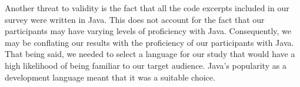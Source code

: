 \par Another threat to validity is the fact that all the code
excerpts included in our survey were written in Java.
This does not account for the fact that our participants may have varying
levels of proficiency with Java.
Consequently, we may be conflating our results with the proficiency of our
participants with Java.
That being said, we needed to select a language for our study that would
have a high likelihood of being familiar to our target audience.
Java's popularity as a development language 
\cite{so-2021-dev-survey, jetbrains-2021-dev-survey} meant that it was a 
suitable choice.

\endinput

